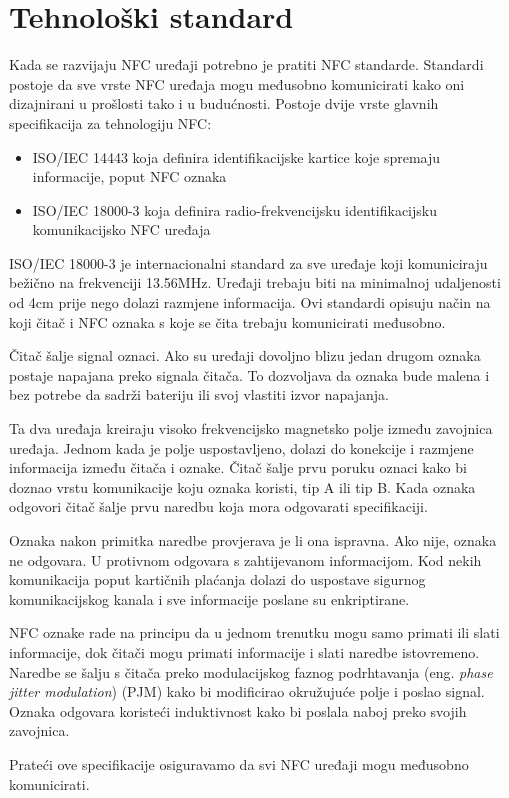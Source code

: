 \documentclass[times, utf8, zavrsni]{fer}
\begin{document}
\section{Tehnološki standard}
Kada se razvijaju NFC uređaji potrebno je pratiti NFC standarde. Standardi postoje da sve vrste NFC uređaja mogu međusobno komunicirati kako oni dizajnirani u prošlosti tako i u budućnosti. Postoje dvije vrste glavnih specifikacija za tehnologiju NFC:
\begin{itemize}
\item ISO/IEC 14443 koja definira identifikacijske kartice koje spremaju informacije, poput NFC oznaka
\item ISO/IEC 18000-3 koja definira radio-frekvencijsku identifikacijsku komunikacijsko NFC uređaja
\end{itemize}\par 
ISO/IEC 18000-3 je internacionalni standard za sve uređaje koji komuniciraju bežično na frekvenciji 13.56MHz. Uređaji trebaju biti na minimalnoj udaljenosti od 4cm prije nego dolazi razmjene informacija. Ovi standardi opisuju način na koji čitač i NFC oznaka s koje se čita trebaju komunicirati međusobno.\par
Čitač šalje signal oznaci. Ako su uređaji dovoljno blizu jedan drugom oznaka postaje napajana preko signala čitača. To dozvoljava da oznaka bude malena i bez potrebe da sadrži bateriju ili svoj vlastiti izvor napajanja.\par
Ta dva uređaja kreiraju visoko frekvencijsko magnetsko polje između zavojnica uređaja. Jednom kada je polje uspostavljeno, dolazi do konekcije i razmjene informacija između čitača i oznake. Čitač šalje prvu poruku oznaci kako bi doznao vrstu komunikacije koju oznaka koristi, tip A ili tip B. Kada oznaka odgovori čitač šalje prvu naredbu koja mora odgovarati specifikaciji.\par 
Oznaka nakon primitka naredbe provjerava je li ona ispravna. Ako nije, oznaka ne odgovara. U protivnom odgovara s zahtijevanom informacijom. Kod  nekih komunikacija poput kartičnih plaćanja dolazi do uspostave sigurnog komunikacijskog kanala i sve informacije poslane su enkriptirane.\par 
NFC oznake rade na principu da u jednom trenutku mogu samo primati ili slati informacije, dok čitači mogu primati informacije i slati naredbe istovremeno. Naredbe se šalju s čitača preko modulacijskog faznog podrhtavanja (eng. \textit{phase jitter modulation}) (PJM) kako bi modificirao okružujuće polje i poslao signal. Oznaka odgovara koristeći induktivnost kako bi poslala naboj preko svojih zavojnica.\par 
Prateći ove specifikacije osiguravamo da svi NFC uređaji mogu međusobno komunicirati.
\citep{4}
\end{document}
